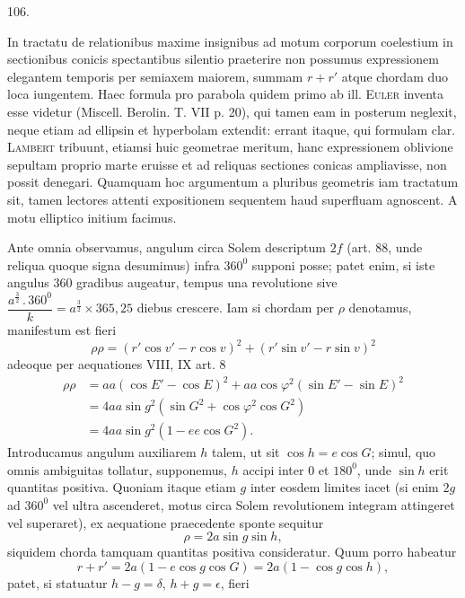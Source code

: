 \par{}\medskip
\hypertarget{native-146-article106}{}
\begin{center}106.\end{center}
In tractatu de relationibus maxime insignibus ad motum corporum coelestium in sectionibus conicis spectantibus silentio praeterire non possumus expressionem elegantem temporis per semiaxem maiorem, summam $r+r'$ atque chordam duo loca iungentem. Haec formula pro parabola quidem primo ab ill. \textsc{Euler} inventa esse videtur (Miscell. Berolin. T. VII p. 20), qui tamen eam in posterum neglexit, neque etiam ad ellipsin et hyperbolam extendit: errant itaque, qui formulam clar. \textsc{Lambert} tribuunt, etiamsi huic geometrae meritum, hanc expressionem oblivione sepultam proprio marte eruisse et ad reliquas sectiones conicas ampliavisse, non possit denegari. Quamquam hoc argumentum a pluribus geometris iam tractatum sit, tamen lectores attenti expositionem sequentem haud superfluam agnoscent. A motu elliptico initium facimus.
\par
Ante omnia observamus, angulum circa Solem descriptum $2f$ (art. 88, unde reliqua quoque signa desumimus) infra $360^0$ supponi posse; patet enim, si iste angulus 360 gradibus augeatur, tempus una revolutione sive $\dfrac{a^{\frac32}\mathpunct{.}360^0}{k}=a^{\frac32}\times365{,}25$ diebus crescere. Iam si chordam per $\rho$ denotamus, manifestum est fieri
\[
\rho\rho=(r'\cos v'-r\cos v)^2+(r'\sin v'-r\sin v)^2
\]
\noindent adeoque per aequationes VIII, IX art. 8
\[
\begin{aligned}
\rho\rho&=aa(\cos E'-\cos E)^2+aa\cos\varphi^2(\sin E'-\sin E)^2\\[.6em]
&=4aa\sin g^2(\sin G^2+\cos\varphi^2\cos G^2)\\[.6em]
&=4aa\sin g^2(1-ee\cos G^2).
\end{aligned}
\]
\noindent Introducamus angulum auxiliarem $h$ talem, ut sit $\cos h=e\cos G$; simul, quo omnis ambiguitas tollatur, supponemus, $h$ accipi inter 0 et $180^0$, unde $\sin h$ erit quantitas positiva. Quoniam itaque etiam $g$ inter eosdem limites iacet (si enim $2g$ ad $360^0$ vel ultra ascenderet, motus circa Solem revolutionem integram attingeret vel superaret), ex aequatione praecedente sponte sequitur
\[
\rho=2a\sin g\sin h,
\]
\noindent siquidem chorda tamquam quantitas positiva consideratur. Quum porro habeatur
\[
r+r'=2a(1-e\cos g\cos G)=2a(1-\cos g\cos h),
\]
\noindent patet, si statuatur $h-g=\delta$, $h+g=\epsilon$, fieri
